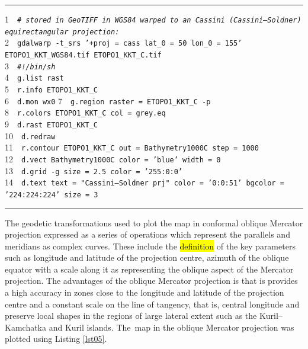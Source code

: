 \documentclass[technologies,article,accept,pdftex,moreauthors]{Definitions/mdpi}
\begin{document}
\begin{listing}[H]
\caption{GRASS GIS %
 script for plotting map in Cassini--Soldner projection.}\label{lst04}
 \rule{\columnwidth}{1pt}
 \raggedright
1~~\texttt{\emph{\# stored in GeoTIFF in WGS84 warped to an Cassini (Cassini--Soldner) equirectangular projection:\\}}
2~~\texttt{gdalwarp -t\_srs '+proj = cass lat\_0 = 50 lon\_0 = 155' ETOPO1\_KKT\_WGS84.tif ETOPO1\_KKT\_C.tif\\}
3~~\texttt{\emph{\#!/bin/sh\\}}
4~~\texttt{g.list rast\\}
5~~\texttt{r.info ETOPO1\_KKT\_C\\}
6~~\texttt{d.mon wx0}
7~~\texttt{g.region raster = ETOPO1\_KKT\_C -p\\}
8~~\texttt{r.colors ETOPO1\_KKT\_C col = grey.eq\\}
9~~\texttt{d.rast ETOPO1\_KKT\_C\\}
10~~\texttt{d.redraw\\}
11~~\texttt{r.contour ETOPO1\_KKT\_C out = Bathymetry1000C step = 1000\\}
12~~\texttt{d.vect Bathymetry1000C color = 'blue' width = 0\\}
13~~\texttt{d.grid -g size = 2.5 color = '255:0:0'\\}
14~~\texttt{d.text text = "Cassini--Soldner prj" color = '0:0:51' bgcolor = '224:224:224' size = 3\\}
\rule{\columnwidth}{1pt}
\end{listing}

The geodetic transformations used to plot the map in conformal oblique Mercator projection expressed as a series of operations which represent the parallels and meridians as complex curves. These include the \hl{definition} of the key parameters such as longitude and latitude of the projection centre, azimuth of the oblique equator with a scale along it as representing the oblique aspect of the Mercator projection. The advantages of the oblique Mercator projection is that is provides a high accuracy in zones close to the longitude and latitude of the projection centre and a constant scale on the line of tangency, that is, central longitude and preserve local shapes in the regions of large lateral extent such as the Kuril--Kamchatka and Kuril islands. The~map in the oblique Mercator projection was plotted using Listing \ref{lst05}.
\end{document}
